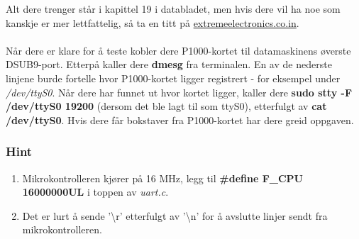 \documentclass[11pt,a4paper]{article}
\begin{document}
Alt dere trenger står i kapittel 19 i databladet, men hvis dere vil ha noe som kanskje er mer lettfattelig, så ta en titt på \href{http://extremeelectronics.co.in/avr-tutorials/using-the-usart-of-avr-microcontrollers/}{extremeelectronics.co.in}.\\
\\
Når dere er klare for å teste kobler dere P1000-kortet til datamaskinens øverste DSUB9-port. Etterpå kaller dere \textbf{dmesg} fra terminalen. En av de nederste linjene burde fortelle hvor P1000-kortet ligger registrert - for eksempel under \textit{/dev/ttyS0}. Når dere har funnet ut hvor kortet ligger, kaller dere \textbf{sudo stty -F /dev/ttyS0 19200} (dersom det ble lagt til som ttyS0), etterfulgt av \textbf{cat /dev/ttyS0}. Hvis dere får bokstaver fra P1000-kortet har dere greid oppgaven.
\subsubsection{Hint}
\begin{enumerate}
\item Mikrokontrolleren kjører på 16 MHz, legg til \textbf{\#define F\_CPU 16000000UL} i toppen av \textit{uart.c}.
\item Det er lurt å sende '\textbackslash r' etterfulgt av '\textbackslash n' for å avslutte linjer sendt fra mikrokontrolleren.
\end{enumerate}

\appendix
\end{document}
